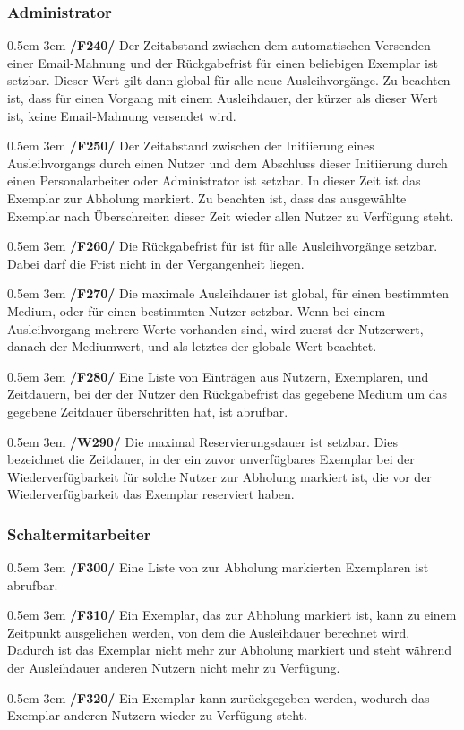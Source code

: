 \documentclass{article}
\newcommand{\specification}[3]{
	{\parindent 0.5em \hangindent 3em \hypertarget{spec:#1:#2}{\textbf{/#1#2/}} #3 \par \nobreak \vspace*{0.5em}}
}
\begin{document}
		\subsubsection{Administrator}
			\specification{F}{240}{Der Zeitabstand zwischen dem automatischen Versenden einer Email-Mahnung und der Rückgabefrist für einen beliebigen Exemplar ist setzbar.
				Dieser Wert gilt dann global für alle neue Ausleihvorgänge. Zu beachten ist, dass für einen Vorgang mit einem Ausleihdauer, der kürzer als dieser Wert ist, keine Email-Mahnung versendet wird. }
			\specification{F}{250}{Der Zeitabstand zwischen der Initiierung eines Ausleihvorgangs durch einen Nutzer und dem Abschluss dieser Initiierung durch einen Personalarbeiter oder Administrator ist setzbar.
				In dieser Zeit ist das Exemplar zur Abholung markiert. Zu beachten ist, dass das ausgewählte Exemplar nach Überschreiten dieser Zeit wieder allen Nutzer zu Verfügung steht. }
			\specification{F}{260}{Die Rückgabefrist für ist für alle Ausleihvorgänge setzbar. Dabei darf die Frist nicht in der Vergangenheit liegen. }
			\specification{F}{270}{Die maximale Ausleihdauer ist global, für einen bestimmten Medium, oder für einen bestimmten Nutzer setzbar.
				Wenn bei einem Ausleihvorgang mehrere Werte vorhanden sind, wird zuerst der Nutzerwert, danach der Mediumwert, und als letztes der globale Wert beachtet. }
			\specification{F}{280}{Eine Liste von Einträgen aus Nutzern, Exemplaren, und Zeitdauern, bei der der Nutzer den Rückgabefrist das gegebene Medium um das gegebene Zeitdauer überschritten hat, ist abrufbar. }
			\specification{W}{290}{Die maximal Reservierungsdauer ist setzbar.
				Dies bezeichnet die Zeitdauer, in der ein zuvor unverfügbares Exemplar bei der Wiederverfügbarkeit für solche Nutzer zur Abholung markiert ist, die vor der Wiederverfügbarkeit das Exemplar reserviert haben.  }
		\subsubsection{Schaltermitarbeiter}
			\specification{F}{300}{Eine Liste von zur Abholung markierten Exemplaren ist abrufbar. }
			\specification{F}{310}{Ein Exemplar, das zur Abholung markiert ist, kann zu einem Zeitpunkt ausgeliehen werden, von dem die Ausleihdauer berechnet wird.
				Dadurch ist das Exemplar nicht mehr zur Abholung markiert und steht während der Ausleihdauer anderen Nutzern nicht mehr zu Verfügung. }
			\specification{F}{320}{Ein Exemplar kann zurückgegeben werden, wodurch das Exemplar anderen Nutzern wieder zu Verfügung steht. }
\end{document}
